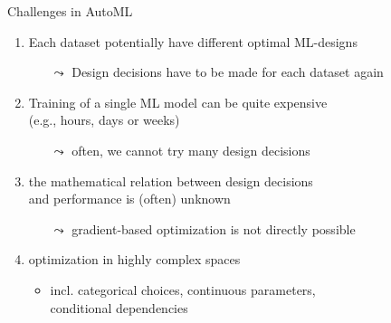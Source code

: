 \begin{frame}[c]{Challenges in AutoML}

\begin{enumerate}
  \item Each dataset potentially have different optimal ML-designs
  \begin{itemize}
    \item[$\leadsto$] Design decisions have to be made for each dataset again
  \end{itemize}
  \smallskip
  \pause
  \item Training of a single ML model can be quite expensive\\
  		(e.g., hours, days or weeks)
  \begin{itemize}
    \item[$\leadsto$] often, we cannot try many design decisions
  \end{itemize}
  \smallskip
  \pause
  \item the mathematical relation between design decisions\\ and performance is (often) unknown
  \begin{itemize}
    \item[$\leadsto$] gradient-based optimization is not directly possible
  \end{itemize}
  \smallskip
  \pause
  \item optimization in highly complex spaces
  \begin{itemize}
    \item incl. categorical choices, continuous parameters,\\ conditional dependencies
  \end{itemize}
  
\end{enumerate}

\end{frame}

